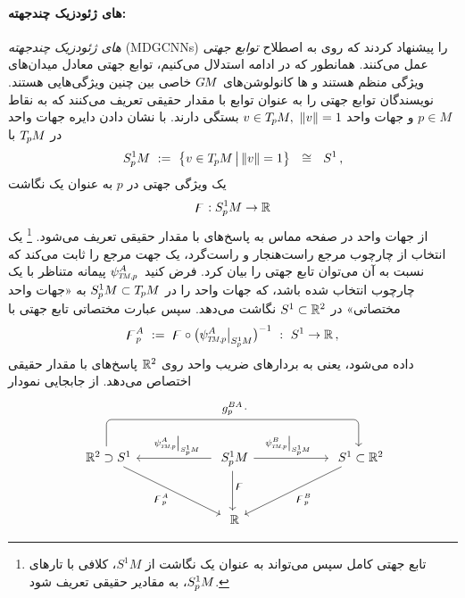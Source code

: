 \paragraph{های ژئودزیک چندجهته:}
\citet{poulenard2018multi} \emph{های ژئودزیک چندجهته} (MDGCNNs) را پیشنهاد کردند که روی به اصطلاح \emph{توابع جهتی} عمل می‌کنند.
همانطور که در ادامه استدلال می‌کنیم، توابع جهتی معادل میدان‌های ویژگی منظم هستند و ها کانولوشن‌های $G\mkern-1.4muM$ خاصی بین چنین ویژگی‌هایی هستند.
نویسندگان توابع جهتی را به عنوان توابع با مقدار حقیقی تعریف می‌کنند که به نقاط $p\in M$ و جهات واحد $v\in T_{\mkern-1.5mu p}\mkern-.5muM,\ \lVert v\rVert=1$ بستگی دارند.
با نشان دادن دایره جهات واحد در $T_{\mkern-1.5mu p}\mkern-.5muM$ با
\begin{align}
    \SpM\ :=\ \big\{ v\in\TpM \,\big|\, \lVert v\rVert = 1 \big\} \ \ \cong\ \ S^1 \,,
\end{align}
یک ویژگی جهتی در $p$ به عنوان یک نگاشت
\begin{align}
    \digamma: S^1_{\mkern-.5mu p}\mkern-.5muM \to \mathbb{R}
\end{align}
از جهات واحد در صفحه مماس به پاسخ‌های با مقدار حقیقی تعریف می‌شود.%
\footnote{
    تابع جهتی کامل سپس می‌تواند به عنوان یک نگاشت از ${S^1\!M}$، کلافی با تارهای $S^1_{\mkern-.5mu p}\mkern-.5muM$، به مقادیر حقیقی تعریف شود.
}
یک انتخاب از چارچوب مرجع راست‌هنجار و راست‌گرد، یک جهت مرجع را ثابت می‌کند که نسبت به آن می‌توان تابع جهتی را بیان کرد.
فرض کنید~$\psiTMp^A$ پیمانه متناظر با یک چارچوب انتخاب شده باشد، که جهات واحد را در $S^1_{\mkern-.5mu p}\mkern-.5muM \subset T_{\mkern-1.5mu p}\mkern-.5muM$ به «جهات واحد مختصاتی» در $S^1 \subset \mathbb{R}^2$ نگاشت می‌دهد.
سپس عبارت مختصاتی تابع جهتی با
\begin{align}\label{eq:directional_functions_trafo_law_regular}
    \digamma_p^A\ :=\ \digamma \circ \big(\psiTMp^A \big|_{\SpM} \big)^{-1}\ :\ S^1 \to \R \,,
\end{align}
داده می‌شود، یعنی به بردارهای ضریب واحد روی $\mathbb{R}^2$ پاسخ‌های با مقدار حقیقی اختصاص می‌دهد.
از جابجایی نمودار
\begin{equation}\label{cd:directional_function_trafo_law}
\begin{tikzcd}[column sep=60, row sep=32, font=\normalsize]
    \R^2 \supset S^1
        \arrow[rr, rounded corners, to path={ 
            -- ([yshift=5.ex]\tikztostart.north) 
            --node[above, pos=.5]{\small$g_p^{BA} \mkern2mu\cdot$} ([yshift=5.ex]\tikztotarget.north) 
            -- (\tikztotarget.north)
            }]
        \arrow[dr, "\digamma_p^A"']
    & \SpM
        \arrow[d, pos=.4, "\digamma"]
        \arrow[l, pos=.46, "\psiTMp^A \big|_{\SpM}"']
        \arrow[r, pos=.46, "\psiTMp^B \big|_{\SpM}"]
    &  S^1 \subset \R^2
        \arrow[dl, "\digamma_p^B"]
    \\
    & \R
\end{tikzcd}
\end{equation}
